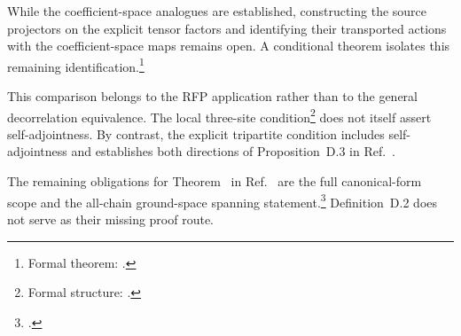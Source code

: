 \documentclass{article}
\begin{document}
While the coefficient-space analogues are established, constructing the source
projectors on the explicit tensor factors and identifying their transported
actions with the coefficient-space maps remains open. A conditional theorem
isolates this remaining identification.\footnote{Formal theorem:
.}

This comparison belongs to the RFP application rather than to the general
decorrelation equivalence. The local three-site
condition\footnote{Formal structure:
.} does not itself
assert self-adjointness. By contrast, the explicit tripartite condition
includes self-adjointness and establishes both directions of Proposition~D.3
in Ref.~\cite{Cirac2016MPDO_arXiv}.

The remaining obligations for Theorem~ in
Ref.~\cite{Cirac2016MPDO_arXiv} are the full canonical-form scope and the
all-chain ground-space spanning statement.\footnote{.}
Definition~D.2 does not serve as their missing proof route.



\end{document}
